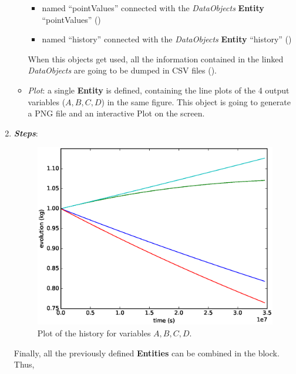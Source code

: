 \begin{enumerate}
\begin{itemize}
     \begin{itemize}
       \item named ``pointValues'' connected with the \textit{DataObjects} \textbf{Entity} ``pointValues''
                ()
       \item named ``history'' connected with the \textit{DataObjects} \textbf{Entity} ``history'' ()
     \end{itemize}
      When this objects get used, all the information contained in the linked  \textit{DataObjects} are going
    to be dumped in CSV files ().
    \item \textit{Plot}: a single  \textbf{Entity} is defined, containing the line plots of the 4 output variables
    ($A,B,C,D$) in the same figure. This object is going to generate a PNG file and an interactive Plot on
    the screen.
  \end{itemize}
   \item \textbf{\textit{Steps}}:
 \begin{figure}[h!]
  \centering
  \includegraphics[scale=0.7]{../../tests/framework/user_guide/SingleRuns/gold/sectionVI.I/1-historyPlot_line-line-line-line.eps}
  \caption{Plot of the history for variables $A,B,C,D$.}
  \label{fig:historyPlotLine}
 \end{figure}
   Finally, all the previously defined \textbf{Entities} can be combined in the  block. Thus,

\end{enumerate}
